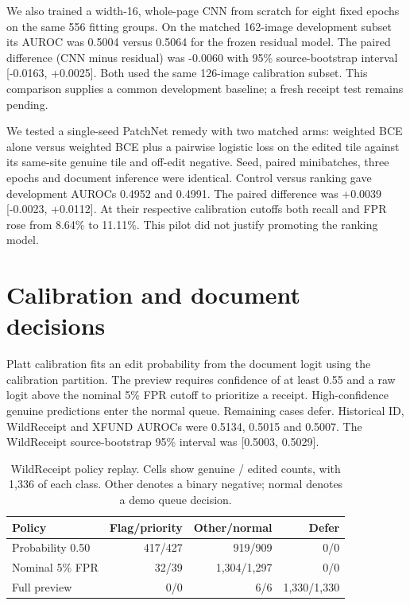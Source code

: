 \documentclass[conference]{IEEEtran}
\begin{document}
We also trained a width-16, whole-page CNN from scratch for eight fixed epochs on the same 556 fitting groups. On the matched 162-image development subset its AUROC was 0.5004 versus 0.5064 for the frozen residual model. The paired difference (CNN minus residual) was -0.0060 with 95\% source-bootstrap interval [-0.0163, +0.0025]. Both used the same 126-image calibration subset. This comparison supplies a common development baseline; a fresh receipt test remains pending.

We tested a single-seed PatchNet remedy with two matched arms: weighted BCE alone versus weighted BCE plus a pairwise logistic loss on the edited tile against its same-site genuine tile and off-edit negative. Seed, paired minibatches, three epochs and document inference were identical. Control versus ranking gave development AUROCs 0.4952 and 0.4991. The paired difference was +0.0039 [-0.0023, +0.0112]. At their respective calibration cutoffs both recall and FPR rose from 8.64\% to 11.11\%. This pilot did not justify promoting the ranking model.

\section{Calibration and document decisions}
Platt calibration fits an edit probability from the document logit using the calibration partition. The preview requires confidence of at least 0.55 and a raw logit above the nominal 5\% FPR cutoff to prioritize a receipt. High-confidence genuine predictions enter the normal queue. Remaining cases defer. Historical ID, WildReceipt and XFUND AUROCs were 0.5134, 0.5015 and 0.5007. The WildReceipt source-bootstrap 95\% interval was [0.5003, 0.5029].

\begin{table}[t]
\caption{WildReceipt policy replay. Cells show genuine / edited counts, with 1,336 of each class. Other denotes a binary negative; normal denotes a demo queue decision.}
\centering\footnotesize
\begin{tabular}{lrrr}
\toprule Policy & Flag/priority & Other/normal & Defer \\ \midrule
Probability 0.50 & 417/427 & 919/909 & 0/0 \\
Nominal 5\% FPR & 32/39 & 1,304/1,297 & 0/0 \\
Full preview & 0/0 & 6/6 & 1,330/1,330 \\
\bottomrule
\end{tabular}
\end{table}
\end{document}
